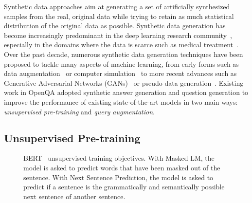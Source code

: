 Synthetic data approaches aim at generating a set of artificially synthesized samples from the real, original data while trying to retain as much statistical distribution of the original data as possible.
%
Synthetic data generation has become increasingly predominant in the deep learning research community~\cite{wang2019learning, tripathi2019learning, lacoste2020synbols}, especially in the domains where the data is scarce such as medical treatment~\cite{chen2021synthetic, frid2018synthetic}.
%
Over the past decade, numerous synthetic data generation techniques have been proposed to tackle many aspects of machine learning, from early forms such as data augmentation~\cite{shorten2019survey, tran2017bayesian} or computer simulation~\cite{richter2016playing, song2017semantic} to more recent advances such as Generative Adversarial Networks (GANs)~\cite{goodfellow2014generative, karras2020analyzing} or pseudo data generation~\cite{arazo2020pseudo, wang2020unsupervised}.
%
Existing work in OpenQA adopted synthetic answer generation and question generation to improve the performance of existing state-of-the-art models in two main ways: \emph{unsupervised pre-training} and \emph{query augmentation}.


\subsection{Unsupervised Pre-training}
\label{sec:unsupervised_pre_training}


\begin{figure}[!ht]
	\centering
	
	\vspace{0.5cm}
	
	\caption[BERT~\cite{devlin2019bert} unsupervised training objectives.]{
		BERT~\cite{devlin2019bert} unsupervised training objectives.
		With Masked LM, the model is asked to predict words that have been masked out of the sentence.
		With Next Sentence Prediction, the model is asked to predict if a sentence is the grammatically and semantically possible next sentence of another sentence.
	}
	\label{fig:unsupervised_pretraining_bert}
\end{figure}


